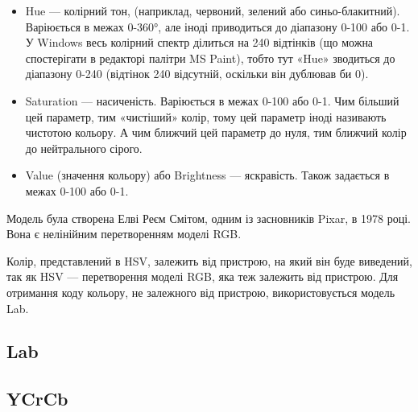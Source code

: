 \begin{itemize}
	\item Hue — колірний тон, (наприклад, червоний, зелений або синьо-блакитний). Варіюється в межах 0-360°, але іноді приводиться до діапазону 0-100 або 0-1. У Windows весь колірний спектр ділиться на 240 відтінків (що можна спостерігати в редакторі палітри MS Paint), тобто тут «Hue» зводиться до діапазону 0-240 (відтінок 240 відсутній, оскільки він дублював би 0).

	\item Saturation — насиченість. Варіюється в межах 0-100 або 0-1. Чим більший цей параметр, тим «чистіший» колір, тому цей параметр іноді називають чистотою кольору. А чим ближчий цей параметр до нуля, тим ближчий колір до нейтрального сірого.
	
	\item Value (значення кольору) або Brightness — яскравість. Також задається в межах 0-100 або 0-1.
\end{itemize}

Модель була створена Елві Реєм Смітом, одним із засновників Pixar, в 1978 році. Вона є нелінійним перетворенням моделі RGB.

Колір, представлений в HSV, залежить від пристрою, на який він буде виведений, так як HSV — перетворення моделі RGB, яка теж залежить від пристрою. Для отримання коду кольору, не залежного від пристрою, використовується модель Lab.

\subsection{Lab}

\subsection{YCrCb}
